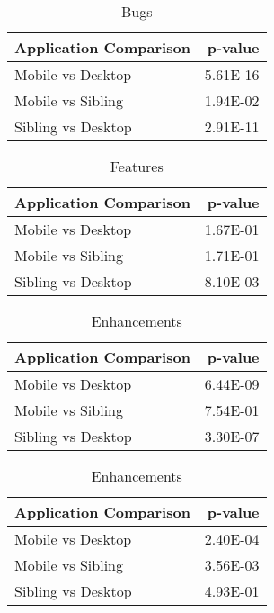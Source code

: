 \begin{table}[ht]
\centering
\caption{Bugs} 
\begin{tabular}{lr}
  \hline
Application Comparison & p-value \\ 
  \hline
Mobile vs Desktop & 5.61E-16 \\ 
  Mobile vs Sibling & 1.94E-02 \\ 
  Sibling vs Desktop & 2.91E-11 \\ 
   \hline
\end{tabular}
\end{table}
\begin{table}[ht]
\centering
\caption{Features} 
\begin{tabular}{lr}
  \hline
Application Comparison & p-value \\ 
  \hline
Mobile vs Desktop & 1.67E-01 \\ 
  Mobile vs Sibling & 1.71E-01 \\ 
  Sibling vs Desktop & 8.10E-03 \\ 
   \hline
\end{tabular}
\end{table}
\begin{table}[ht]
\centering
\caption{Enhancements} 
\begin{tabular}{lr}
  \hline
Application Comparison & p-value \\ 
  \hline
Mobile vs Desktop & 6.44E-09 \\ 
  Mobile vs Sibling & 7.54E-01 \\ 
  Sibling vs Desktop & 3.30E-07 \\ 
   \hline
\end{tabular}
\end{table}
\begin{table}[ht]
\centering
\caption{Enhancements} 
\begin{tabular}{lr}
  \hline
Application Comparison & p-value \\ 
  \hline
Mobile vs Desktop & 2.40E-04 \\ 
  Mobile vs Sibling & 3.56E-03 \\ 
  Sibling vs Desktop & 4.93E-01 \\ 
   \hline
\end{tabular}
\end{table}
